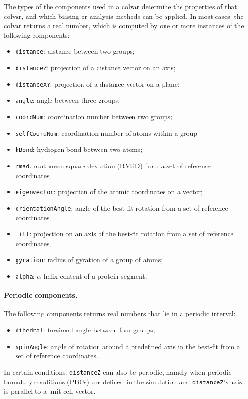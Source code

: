 The types of the components used in a colvar determine the properties
of that colvar, and which biasing or analysis methods can be applied.
In most cases, the colvar returns a real number, which is computed by
one or more instances of the following components:
\begin{itemize}
\item \texttt{distance}: distance between two groups;
\item \texttt{distanceZ}: projection of a distance vector on an axis;
\item \texttt{distanceXY}: projection of a distance vector on a plane;
\item \texttt{angle}: angle between three groups;
\item \texttt{coordNum}: coordination number between two groups;
\item \texttt{selfCoordNum}: coordination number of atoms within a
  group;
\item \texttt{hBond}: hydrogen bond between two atoms;
\item \texttt{rmsd}: root mean square deviation (RMSD) from a set of
  reference coordinates;
\item \texttt{eigenvector}: projection of the atomic coordinates on a
  vector;
\item \texttt{orientationAngle}: angle of the best-fit rotation from
  a set of reference coordinates;
\item \texttt{tilt}: projection on an axis of the best-fit rotation
  from a set of reference coordinates;
\item \texttt{gyration}: radius of gyration of a group of atoms;
\item \texttt{alpha}: $\alpha$-helix content of a protein segment.
\end{itemize}


\paragraph*{Periodic components.}  The following components returns
real numbers that lie in a periodic interval:
\begin{itemize}
\item \texttt{dihedral}: torsional angle between four groups;
\item \texttt{spinAngle}: angle of rotation around a predefined axis
  in the best-fit from a set of reference coordinates.
\end{itemize}
In certain conditions, \texttt{distanceZ} can also be periodic, namely
when periodic boundary conditions (PBCs) are defined in the simulation
and \texttt{distanceZ}'s axis is parallel to a unit cell vector.

